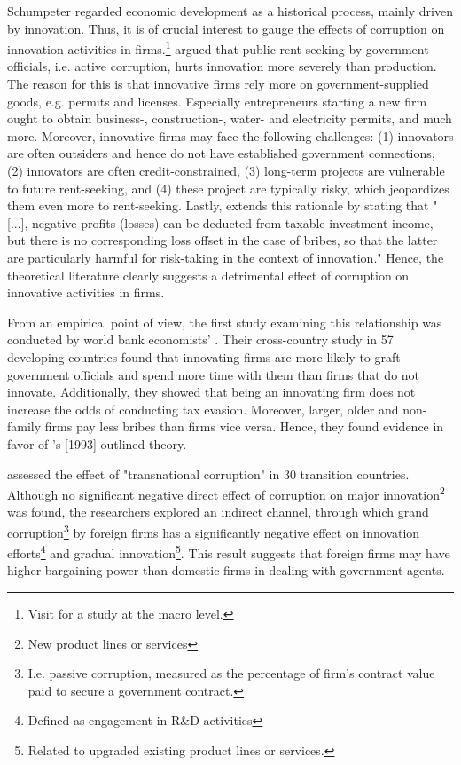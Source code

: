 Schumpeter regarded economic development as a historical process, mainly driven by innovation. \citep[p. 90]{sledzik2013schumpeter} Thus, it is of crucial interest to gauge the effects of corruption on innovation activities in firms.\footnote{Visit \citet{anokhin2009entrepreneurship} for a study at the macro level.} \citet[p. 409--413]{murphy1993rent} argued that public rent-seeking by government officials, i.e. active corruption, hurts innovation more severely than production. The reason for this is that innovative firms rely more on government-supplied goods, e.g. permits and licenses. Especially entrepreneurs starting a new firm ought to obtain business-, construction-, water- and electricity permits, and much more. Moreover, innovative firms may face the following challenges: (1) innovators are often outsiders and hence do not have established government connections, (2) innovators are often credit-constrained, (3) long-term projects are vulnerable to future rent-seeking, and (4) these project are typically risky, which jeopardizes them even more to rent-seeking. Lastly, \citet[p. 1328]{bardhan1997corruption} extends this rationale by stating that "[...], negative profits (losses) can be deducted from taxable investment income, but there is no corresponding loss offset in the case of bribes, so that the latter are particularly harmful for risk-taking in the context of innovation." Hence, the theoretical literature clearly suggests a detrimental effect of corruption on innovative activities in firms.

From an empirical point of view, the first study examining this relationship was conducted by world bank economists' \citet{ayyagari2010innovating}. Their cross-country study in 57 developing countries found that innovating firms are more likely to graft government officials and spend more time with them than firms that do not innovate. Additionally, they showed that being an innovating firm does not increase the odds of conducting tax evasion. Moreover, larger, older and non-family firms pay less bribes than firms vice versa. Hence, they found evidence in favor of \citeauthor{murphy1993rent}'s [1993] outlined theory. 

\citet{habiyaremye2013transnational} assessed the effect of "transnational corruption" in 30 transition countries. Although no significant negative direct effect of corruption on major innovation\footnote{New product lines or services} was found, the researchers explored an indirect channel, through which grand corruption\footnote{I.e. passive corruption, measured as the percentage of firm's contract value paid to secure a government contract.} by foreign firms has a significantly negative effect on innovation efforts\footnote{Defined as engagement in R\&D activities} and gradual innovation\footnote{Related to upgraded existing product lines or services.}. This result suggests that foreign firms may have higher bargaining power than domestic firms in dealing with government agents. 

